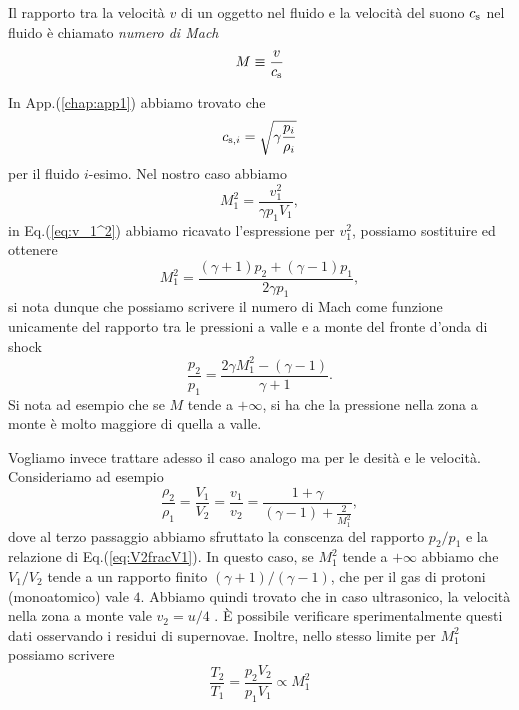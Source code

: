\begin{definition}
    Il rapporto tra la velocità $v$ di un oggetto nel fluido e la velocità del suono $c_\textup{s}$ nel fluido è chiamato \emph{numero di Mach}
    \begin{equation*}
        M \equiv \frac{v}{c_\textup{s}}
    \end{equation*}    
\end{definition}
In App.(\ref{chap:app1}) abbiamo trovato che 
\begin{equation*}
    c_{\textup{s}, i} = \sqrt{\gamma \frac{p_i}{\rho_i}}
\end{equation*}
per il fluido $i$-esimo. Nel nostro caso abbiamo
\begin{equation*}
    M_1^2 = \frac{v_1^2}{\gamma p_1 V_1},
\end{equation*}
in Eq.(\ref{eq:v_1^2}) abbiamo ricavato l'espressione per $v_1^2$, possiamo sostituire ed ottenere
\begin{equation*}
    M_1^2 = \frac{(\gamma + 1)p_2 + (\gamma - 1)p_1}{2 \gamma p_1},
\end{equation*}
si nota dunque che possiamo scrivere il numero di Mach come funzione unicamente del rapporto tra le pressioni a valle e a monte del fronte d'onda di shock
\begin{equation*}
    \frac{p_2}{p_1} = \frac{2 \gamma M_1^2 - (\gamma - 1)}{\gamma + 1}.
\end{equation*}
Si nota ad esempio che se $M$ tende a $+\infty$, si ha che la pressione nella zona a monte è molto maggiore di quella a valle.

Vogliamo invece trattare adesso il caso analogo ma per le desità e le velocità. Consideriamo ad esempio 
\begin{equation*}
    \frac{\rho_2}{\rho_1} = \frac{V_1}{V_2} = \frac{v_1}{v_2} = \frac{1 + \gamma}{(\gamma - 1) + \frac{2}{M_1^2}},
\end{equation*}
dove al terzo passaggio abbiamo sfruttato la conscenza del rapporto $p_2 / p_1$ e la relazione di Eq.(\ref{eq:V2fracV1}). In questo caso, se $M_1^2$ tende a $+\infty$ abbiamo che $V_1/V_2$ tende a un rapporto finito $(\gamma + 1) / (\gamma - 1)$, che per il gas di protoni (monoatomico) vale $4$. Abbiamo quindi trovato che in caso ultrasonico, la velocità nella zona a monte vale $v_2 = u/4$ . È possibile verificare sperimentalmente questi dati osservando i residui di supernovae. Inoltre, nello stesso limite per $M_1^2$ possiamo scrivere
\begin{equation*}
    \frac{T_2}{T_1} = \frac{p_2V_2}{p_1V_1} \varpropto M_1^2
\end{equation*}

